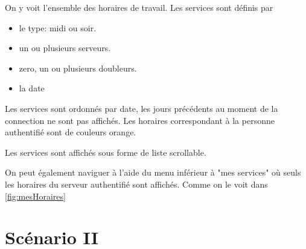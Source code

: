 On y voit l'ensemble des horaires de travail. Les services sont définis par
\begin{itemize}
    \item le type: midi ou soir.
    \item un ou plusieurs serveurs.
    \item zero, un ou plusieurs doubleurs.
    \item la date
\end{itemize}
Les services sont ordonnés par date, les jours précédents au moment de la connection ne 
sont pas affichés. Les horaires correspondant à la personne authentifié sont de couleurs orange.

Les services sont affichés sous forme de liste scrollable.

On peut également naviguer à l'aide du menu inférieur à "mes services" où seuls les horaires du serveur authentifié sont affichés. Comme on le voit 
dans \ref{fig:mesHoraires}

\section[Mise en bourse d'un service - Scénario II]{Scénario II}
